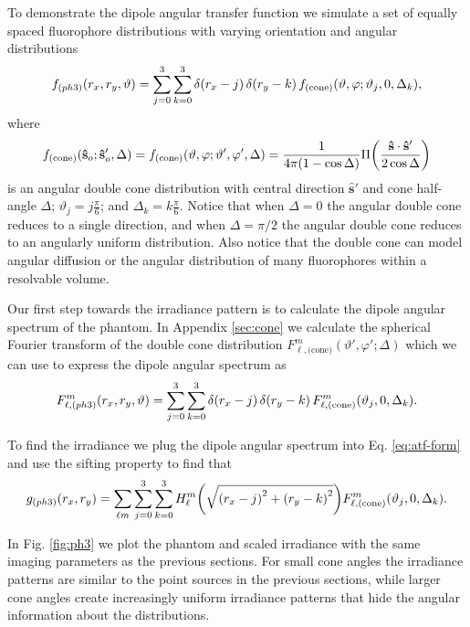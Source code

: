 \documentclass[]{osa-article}
\let\originalleft\left
\let\originalright\right
\renewcommand{\left}{\mathopen{}\mathclose\bgroup\originalleft}
\renewcommand{\right}{\aftergroup\egroup\originalright}
\providecommand{\so}{\mathbf{\hat{s}}_o}
\providecommand{\mh}[1]{\mathbf{\hat{#1}}}
\begin{document}
 To demonstrate the dipole angular transfer function we simulate a set of
 equally spaced fluorophore distributions with varying orientation and angular
 distributions
 \begin{align}
   f_{(ph3)}(r_x, r_y, \vartheta) = \sum_{j=0}^3 \sum_{k=0}^3 \delta\left(r_x - j\right)\, \delta\left(r_y - k\right)\, f_{\text{(cone)}}\left(\vartheta, \varphi; \vartheta_j, 0, \Delta_k\right),\label{eq:phantom3}
 \end{align}
 where
 \begin{align}
   f_{\text{(cone)}}(\so; \so', \Delta) = f_{\text{(cone)}}(\vartheta, \varphi; \vartheta', \varphi', \Delta) = \frac{1}{4\pi(1 - \cos\Delta)}\Pi\left(\frac{\mh{s}\cdot\mh{s}'}{2\cos\Delta}\right)
 \end{align}
 is an angular double cone distribution with central direction $\mh{s}'$ and
 cone half-angle $\Delta$; $\vartheta_j = j\frac{\pi}{6}$; and
 $\Delta_k = k\frac{\pi}{6}$. Notice that when $\Delta = 0$ the angular double
 cone reduces to a single direction, and when $\Delta = \pi/2$ the angular
 double cone reduces to an angularly uniform distribution. Also notice that the
 double cone can model angular diffusion or the angular distribution of many
 fluorophores within a resolvable volume.
 
 Our first step towards the irradiance pattern is to calculate the dipole
 angular spectrum of the phantom. In Appendix \ref{sec:cone} we calculate the
 spherical Fourier transform of the double cone distribution
 $F^m_{\ell,\text{(cone)}}(\vartheta', \varphi'; \Delta)$ which we can use to
 express the dipole angular spectrum as
 \begin{align}
   F^{m}_{\ell,(ph3)}(r_x, r_y, \vartheta) = \sum_{j=0}^3 \sum_{k=0}^3 \delta\left(r_x - j\right)\, \delta\left(r_y - k\right)\, F^m_{\ell,\text{(cone)}}\left(\vartheta_j, 0, \Delta_k\right).\label{eq:phantom3spect}
 \end{align}

 To find the irradiance we plug the dipole angular spectrum into Eq.
 \eqref{eq:atf-form} and use the sifting property to find that
 \begin{align}
   g_{(ph3)}(r_x, r_y) = \sum_{\ell m}\sum_{j=0}^3 \sum_{k=0}^3 H_\ell^m\left(\sqrt{\left(r_x - j\right)^2 + \left(r_y - k\right)^2}\right) F^m_{\ell,\text{(cone)}}\left(\vartheta_j, 0, \Delta_k\right).\label{eq:phantom3irr}
 \end{align}

 In Fig. \ref{fig:ph3} we plot the phantom and scaled irradiance with the same
 imaging parameters as the previous sections. For small cone angles the
 irradiance patterns are similar to the point sources in the previous sections,
 while larger cone angles create increasingly uniform irradiance patterns that
 hide the angular information about the distributions.
\end{document}
